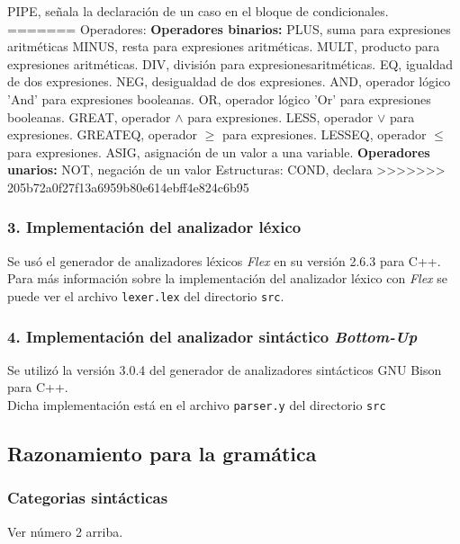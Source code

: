 \documentclass[12pt]{article}
\begin{document}
\begin{outline}
    \2 PIPE, señala la declaración de un caso en el bloque de condicionales.
=======
\1 Operadores:
    \2 \textbf{Operadores binarios:}
        \3 PLUS, suma para expresiones aritméticas
        \3 MINUS, resta para expresiones aritméticas.
        \3 MULT, producto para expresiones aritméticas.
        \3 DIV, división para expresionesaritméticas.
        \3 EQ, igualdad de dos expresiones.
        \3 NEG, desigualdad de dos expresiones.
        \3 AND, operador lógico 'And' para expresiones booleanas.
        \3 OR, operador lógico 'Or' para expresiones booleanas.
        \3 GREAT, operador $\land$ para expresiones.
        \3 LESS, operador $\lor$ para expresiones.
        \3 GREATEQ, operador $\geq$ para expresiones.
        \3 LESSEQ, operador $\leq$ para expresiones.
        \3 ASIG, asignación de un valor a una variable.
    \2 \textbf{Operadores unarios:}
        \3 NOT, negación de un valor
 \1 Estructuras:
    \2 COND, declara
>>>>>>> 205b72a0f27f13a6959b80e614ebff4e824c6b95
\end{outline}
\subsubsection*{3. Implementación del analizador léxico}
Se usó el generador de analizadores léxicos \textit{Flex} en su versión 2.6.3 para C++. \\
Para más información sobre la implementación del analizador léxico con \textit{Flex} se puede ver el archivo \texttt{lexer.lex} del directorio \texttt{src}.\\
\subsubsection*{4. Implementación del analizador sintáctico \textit{Bottom-Up}}
Se utilizó la versión 3.0.4 del generador de analizadores sintácticos GNU Bison para C++. \\
Dicha implementación está en el archivo \texttt{parser.y} del directorio \texttt{src}


\subsection*{Razonamiento para la gramática}
\subsubsection*{Categorias sintácticas}
Ver número 2 arriba.
\end{document}
